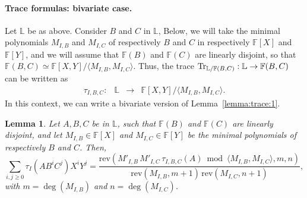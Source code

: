 \documentclass[12pt]{article}
\def\F {\ensuremath{\mathbb{F}}}
\def\L {\ensuremath{\mathbb{L}}}
\def\rev {\ensuremath{\mathrm{rev}}}
\newtheorem{Lemma}{Lemma}
\begin{document}
\paragraph{Trace formulas: bivariate case.} 
Let $\L$ be as above. Consider $B$ and $C$ in $\L$, Below, we will
take the minimal polynomials $M_{I,B}$ and $M_{I,C}$ of respectively
$B$ and $C$ in respectively $\F[X]$ and $\F[Y]$, and we will assume
that $\F(B)$ and $\F(C)$ are linearly disjoint, so that $\F(B,C) \simeq
\F[X,Y]/\langle M_{I,B}, M_{I,C}\rangle$. Thus, the trace ${\rm
  Tr}_{\L/\F(B,C)}: \L \to \F(B,C)$
can be written as 
$$\begin{array}{cccc}
\tau_{I,B,C} :& \L& \to& \F[X,Y]/\langle M_{I,B}, M_{I,C} \rangle.
\end{array}$$
In this context, we can write a bivariate version of Lemma~\ref{lemma:trace:1}.
\begin{Lemma}
  Let $A, B, C$ be in $\L$, such that $\F(B)$ and $\F(C)$ are linearly
  disjoint, and let $M_{I,B}\in \F[X]$ and $M_{I,C}\in \F[Y]$ be the
  minimal polynomials of respectively $B$ and $C$. Then,
  $$\sum_{i,j \ge 0} \tau_I(A B^i C^j) X^i Y^j= 
  \frac{\rev( M'_{I,B}\, M'_{I,C}\, \tau_{I,B,C} (A) \bmod \langle M_{I,B}, M_{I,C}\rangle,m,n)}{\rev(M_{I,B},m+1)\, \rev(M_{I,C},n+1)},$$
  with $m=\deg(M_{I,B})$ and $n=\deg(M_{I,C})$.
\end{Lemma}
\end{document}
